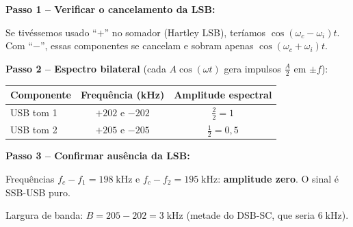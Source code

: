 \documentclass[11pt,a4paper]{article}
\begin{document}
\begin{resolucao}

\textbf{Passo 1 -- Verificar o cancelamento da LSB:}

Se tivéssemos usado ``$+$'' no somador (Hartley LSB), teríamos $\cos(\omega_c - \omega_i)t$. Com ``$-$'', essas componentes se cancelam e sobram apenas $\cos(\omega_c + \omega_i)t$.

\textbf{Passo 2 -- Espectro bilateral} (cada $A\cos(\omega t)$ gera impulsos $\frac{A}{2}$ em $\pm f$):

\begin{center}
\small
\begin{tabular}{lcc}
  \toprule
  Componente & Frequência (kHz) & Amplitude espectral \\
  \midrule
  USB tom 1 & $+202$ e $-202$ & $\frac{2}{2} = 1$ \\[3pt]
  USB tom 2 & $+205$ e $-205$ & $\frac{1}{2} = 0{,}5$ \\
  \bottomrule
\end{tabular}
\end{center}

\textbf{Passo 3 -- Confirmar ausência da LSB:}

Frequências $f_c - f_1 = 198\;\text{kHz}$ e $f_c - f_2 = 195\;\text{kHz}$: \textbf{amplitude zero}. O sinal é SSB-USB puro.

Largura de banda: $B = 205 - 202 = 3\;\text{kHz}$ (metade do DSB-SC, que seria $6\;\text{kHz}$).
\end{resolucao}
\end{document}
